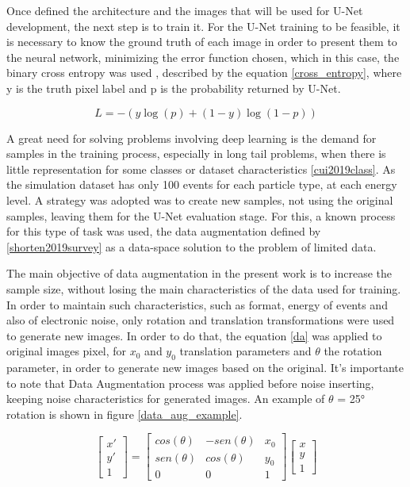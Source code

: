 \documentclass[
        oneside,      %
        english,			
        brazil			 
        ]{abntbibufjf}
\begin{document}
Once defined the architecture and the images that will be used for U-Net development, the next step is to train it. For the U-Net training to be feasible, it is necessary to know the ground truth of each image in order to present them to the neural network, minimizing the error function chosen, which in this case, the binary cross entropy was used , described by the equation \ref{cross_entropy}, where y is the truth pixel label and p is the probability returned by U-Net.

\begin{equation}
    L = -{(y\log(p) + (1 - y)\log(1 - p))}
\label{cross_entropy}
\end{equation}


A great need for solving problems involving deep learning is the demand for samples in the training process, especially in long tail problems, when there is little representation for some classes or dataset characteristics \ref{cui2019class}. As the simulation dataset has only 100 events for each particle type, at each energy level. A strategy was adopted was to create new samples, not using the original samples, leaving them for the U-Net evaluation stage. For this, a known process for this type of task was used, the data augmentation defined by \ref{shorten2019survey} as a data-space solution to the problem of limited data.



The main objective of data augmentation in the present work is to increase the sample size, without losing the main characteristics of the data used for training. In order to maintain such characteristics, such as format, energy of events and also of electronic noise, only rotation and translation transformations were used to generate new images. In order to do that, the equation \ref{da} was applied to original images pixel, for $x_{0}$ and $y_{0}$ translation parameters and $\theta$ the rotation parameter, in order to generate new images based on the original. It's importante to note that Data Augmentation process was applied before noise inserting, keeping noise characteristics for generated images. An example of $\theta$ = 25° rotation is shown in figure \ref{data_aug_example}.


\begin{equation}
 \begin{bmatrix} x' \\ y' \\ 1 \end{bmatrix}
 =
  \begin{bmatrix}
   cos(\theta) & -sen(\theta) & x_{0}\\
   sen(\theta) & cos(\theta) & y_{0}\\
   0           & 0           & 1 
   \end{bmatrix}
   \begin{bmatrix}
    x \\ y \\ 1
   \end{bmatrix}
   \label{da}
\end{equation}
\end{document}
